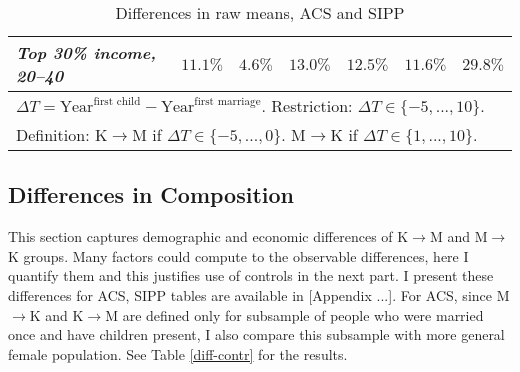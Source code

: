 \documentclass[12pt,letter]{article}
\begin{document}
\begin{table}[h!]
\begin{center}
\begin{tabular}{|l|c||c|c||c||c|c|}
\textit{Top 30\% income, 20--40} & $11.1\%$ & $4.6\%$ & $13.0\%$ & $12.5\%$ & $11.6\%$  & $29.8\%$ \\\hline
\multicolumn{7}{|p{0.9\linewidth}|}{\footnotesize $\Delta T = \text{Year}^{\text{first child}} - \text{Year}^{\text{first marriage}}$. Restriction: $\Delta T \in \{-5,...,10\}$.}\\
\multicolumn{7}{|p{0.9\linewidth}|}{\footnotesize Definition: K$\to$M if $\Delta T \in \{-5,...,0\}$. M$\to$K if $\Delta T \in \{1,...,10\}$.}\\
\hline
\end{tabular}
\caption{Differences in raw means, ACS and SIPP\label{diff-raw}}
\end{center}
\end{table}


\subsection{Differences in Composition}
This section captures demographic and economic differences of K$\to$M and M$\to$K groups. Many factors could compute to the observable differences, here I quantify them and this justifies use of controls in the next part. I present these differences for ACS, SIPP tables are available in [Appendix ...]. For ACS, since M$\to$K and K$\to$M are defined only for subsample of people who were married once and have children present, I also compare this subsample with more general female population. See Table \ref{diff-contr} for the results.
\end{document}
